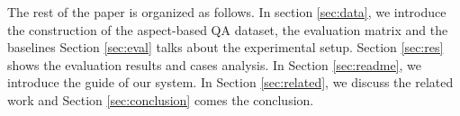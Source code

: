 The rest of the paper is organized as follows. 
In section \ref{sec:data}, we introduce the construction of the aspect-based QA dataset, the evaluation matrix and the baselines
Section \ref{sec:eval} talks about the experimental setup.
Section \ref{sec:res} shows the evaluation results and cases analysis.
In Section \ref{sec:readme}, we introduce the guide of our system.
In Section \ref{sec:related}, we discuss the related work and Section \ref{sec:conclusion} comes the conclusion.
 
